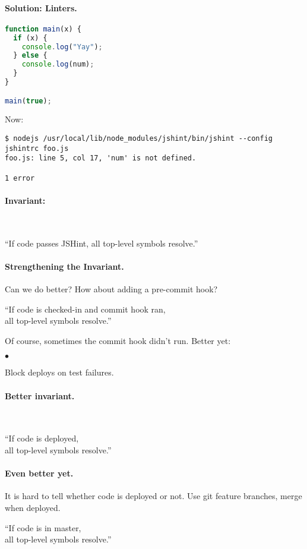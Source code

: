 \documentclass[11pt]{article}
\newcommand{\squishlist}{
 \begin{list}{$\bullet$}
  { \setlength{\itemsep}{0pt}
     \setlength{\parsep}{3pt}
     \setlength{\topsep}{3pt}
     \setlength{\partopsep}{0pt}
     \setlength{\leftmargin}{1.5em}
     \setlength{\labelwidth}{1em}
     \setlength{\labelsep}{0.5em} } }
\newcommand{\squishend}{
  \end{list}  }
\begin{document}
\paragraph{Solution: Linters.}
\begin{lstlisting}[language=JavaScript]
function main(x) {
  if (x) {
    console.log("Yay");
  } else {
    console.log(num);
  }
}

main(true);
\end{lstlisting}

Now:
\begin{verbatim}
$ nodejs /usr/local/lib/node_modules/jshint/bin/jshint --config jshintrc foo.js
foo.js: line 5, col 17, 'num' is not defined.

1 error
\end{verbatim}

\vspace*{-1em}
\paragraph{Invariant:}~\\

\begin{center}
``If code passes JSHint, all top-level symbols resolve.''
\end{center}

\paragraph{Strengthening the Invariant.} Can we do better? How about adding a pre-commit hook?
\begin{center}
``If code is checked-in and commit hook ran,\\ all top-level symbols resolve.''
\end{center}
Of course, sometimes the commit hook didn't run. Better yet:
\squishlist
\item Block deploys on test failures.
\squishend

\paragraph{Better invariant.}~\\[1em]
\begin{center}
``If code is deployed,\\ all top-level symbols resolve.''
\end{center}

\paragraph{Even better yet.}
It is hard to tell whether code is deployed or not.
Use git feature branches, merge when deployed.
\begin{center}
``If code is in master,\\ all top-level symbols resolve.''
\end{center}
\end{document}
